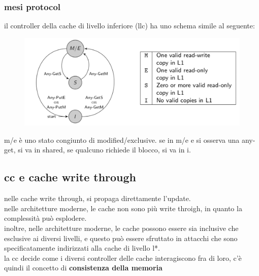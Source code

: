 \documentclass[12pt, oneside]{extbook} %
\begin{document}
\subsubsection{mesi protocol}
il controller della cache di livello inferiore (llc) ha uno schema simile al seguente:\\ 
\begin{figure}
	\includegraphics[scale=0.3]{immagini/llc_mesi.png}
\end{figure}
m/e è uno stato congiunto di modified/exclusive. se in m/e e si osserva una any-get, si va in shared, se qualcuno richiede il blocco, si va in i.

\subsection{cc e cache write through}
nelle cache write through, si propaga direttamente l'update.\\nelle architetture moderne, le cache non sono più write throigh, in quanto la complessità può esplodere.\\inoltre, nelle architetture moderne, le cache possono essere sia inclusive che esclusive ai diversi livelli, e questo può essere sfruttato in attacchi che sono specificatamente indirizzati alla cache di livello l*.\\la cc decide come i diversi controller delle cache interagiscono fra di loro, c'è quindi il concetto di \textbf{consistenza della memoria}
\end{document}
